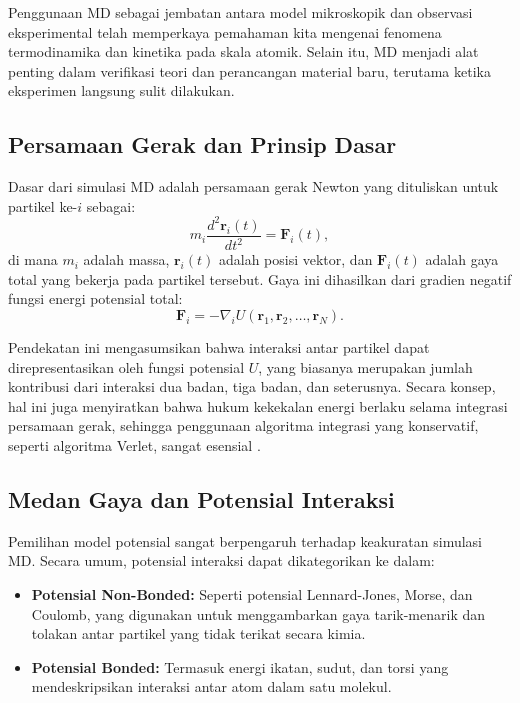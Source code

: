 Penggunaan MD sebagai jembatan antara model mikroskopik dan observasi eksperimental telah memperkaya pemahaman kita mengenai fenomena termodinamika dan kinetika pada skala atomik. Selain itu, MD menjadi alat penting dalam verifikasi teori dan perancangan material baru, terutama ketika eksperimen langsung sulit dilakukan.

\subsection{Persamaan Gerak dan Prinsip Dasar}
Dasar dari simulasi MD adalah persamaan gerak Newton yang dituliskan untuk partikel ke-\(i\) sebagai:
\begin{equation}
    m_i \frac{d^2 \mathbf{r}_i(t)}{dt^2} = \mathbf{F}_i(t),
\end{equation}
di mana \(m_i\) adalah massa, \(\mathbf{r}_i(t)\) adalah posisi vektor, dan \(\mathbf{F}_i(t)\) adalah gaya total yang bekerja pada partikel tersebut. Gaya ini dihasilkan dari gradien negatif fungsi energi potensial total:
\begin{equation}
    \mathbf{F}_i = -\nabla_i U(\mathbf{r}_1, \mathbf{r}_2, \ldots, \mathbf{r}_N).
\end{equation}

Pendekatan ini mengasumsikan bahwa interaksi antar partikel dapat direpresentasikan oleh fungsi potensial \( U \), yang biasanya merupakan jumlah kontribusi dari interaksi dua badan, tiga badan, dan seterusnya. Secara konsep, hal ini juga menyiratkan bahwa hukum kekekalan energi berlaku selama integrasi persamaan gerak, sehingga penggunaan algoritma integrasi yang konservatif, seperti algoritma Verlet, sangat esensial \citep{allen_computer_1989}.

\subsection{Medan Gaya dan Potensial Interaksi}
Pemilihan model potensial sangat berpengaruh terhadap keakuratan simulasi MD. Secara umum, potensial interaksi dapat dikategorikan ke dalam:
\begin{itemize}
    \item \textbf{Potensial Non-Bonded:} Seperti potensial Lennard-Jones, Morse, dan Coulomb, yang digunakan untuk menggambarkan gaya tarik-menarik dan tolakan antar partikel yang tidak terikat secara kimia.
    \item \textbf{Potensial Bonded:} Termasuk energi ikatan, sudut, dan torsi yang mendeskripsikan interaksi antar atom dalam satu molekul.
\end{itemize}

